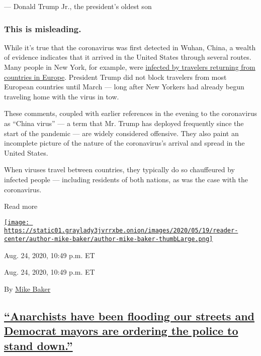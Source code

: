--- Donald Trump Jr., the president's oldest son

\hypertarget{this-is-misleading-1}{%
\subsubsection{This is misleading.}\label{this-is-misleading-1}}

While it's true that the coronavirus was first detected in Wuhan, China,
a wealth of evidence indicates that it arrived in the United States
through several routes. Many people in New York, for example, were
\href{https://www.nytimes3xbfgragh.onion/2020/04/08/science/new-york-coronavirus-cases-europe-genomes.html}{infected
by travelers returning from countries in Europe}. President Trump did
not block travelers from most European countries until March --- long
after New Yorkers had already begun traveling home with the virus in
tow.

These comments, coupled with earlier references in the evening to the
coronavirus as ``China virus'' --- a term that Mr. Trump has deployed
frequently since the start of the pandemic --- are widely considered
offensive. They also paint an incomplete picture of the nature of the
coronavirus's arrival and spread in the United States.

When viruses travel between countries, they typically do so chauffeured
by infected people --- including residents of both nations, as was the
case with the coronavirus.

Read more

\href{https://www.nytimes3xbfgragh.onion/by/mike-baker}{\texttt{[image: https://static01.graylady3jvrrxbe.onion/images/2020/05/19/reader-center/author-mike-baker/author-mike-baker-thumbLarge.png]}}

Aug. 24, 2020, 10:49 p.m. ET

Aug. 24, 2020, 10:49 p.m. ET

By \href{https://www.nytimes3xbfgragh.onion/by/mike-baker}{Mike Baker}

\hypertarget{anarchists-have-been-flooding-our-streets-and-democrat-mayors-are-ordering-the-police-to-stand-down}{%
\subsection{\texorpdfstring{\protect\hyperlink{anarchists-have-been-flooding-our-streets-and-democrat-mayors-are-ordering-the-police-to-stand-down}{``Anarchists
have been flooding our streets and Democrat mayors are ordering the
police to stand
down.''}}{``Anarchists have been flooding our streets and Democrat mayors are ordering the police to stand down.''}}\label{anarchists-have-been-flooding-our-streets-and-democrat-mayors-are-ordering-the-police-to-stand-down}}

